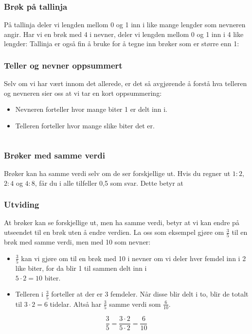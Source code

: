 \st{ \vs
{}
}

\newpage
\subsubsection{Brøk på tallinja}
På tallinja deler vi lengden mellom 0 og 1 inn i like mange lengder som nevneren angir. Har vi en brøk med 4 i nevner, deler vi lengden mellom 0 og 1 inn i 4 like lengder:
Tallinja er også fin å bruke for å tegne inn brøker som er større enn 1:
\subsubsection{Teller og nevner oppsummert}
Selv om vi har vært innom det allerede, er det så avgjørende å forstå hva telleren og nevneren sier oss at vi tar en kort oppsummering:
\begin{itemize}
	\item Nevneren forteller hvor mange biter 1 er delt inn i.
	\item Telleren forteller hvor mange slike biter det er.
\end{itemize}
\newpage
\section{\brvu}
\subsubsection{Brøker med samme verdi}
Brøker kan ha samme verdi selv om de ser forskjellige ut. Hvis du regner ut $ 1:2 $, $ 2:4 $ og $ 4:8 $, får du i alle tilfeller 0,5 som svar. Dette betyr at
 \\[5pt]
 \vsk
{}
\subsubsection{Utviding}
At brøker kan se forskjellige ut, men ha samme verdi, betyr at vi kan endre på utseendet til en brøk uten å endre verdien. La oss som eksempel gjøre om $ \frac{3}{5} $ til en brøk med samme verdi, men med 10 som nevner:
\begin{itemize}
	\item $ \frac{3}{5} $ kan vi gjøre om til en brøk med 10 i nevner om vi deler hver femdel inn i 2 like biter, for da blir 1 til sammen delt inn i\\ $ {5\cdot2=10} $ biter.
	\item Telleren i $ \frac{3}{5} $ forteller at der er 3 femdeler. Når disse blir delt i to, blir de totalt til $ 3\cdot2=6 $ tidelar. Altså har $ \frac{3}{5} $ samme verdi som $ \frac{6}{10} $.
\end{itemize}
\[ \frac{3}{5}=\frac{3\cdot2}{5\cdot2}=\frac{6}{10} \]

